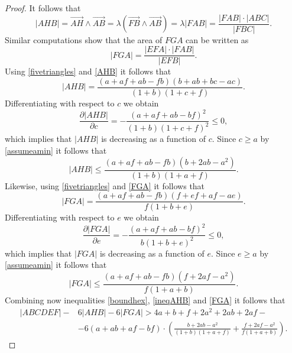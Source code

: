 \documentclass [10pt,oneside]{amsart}
\theoremstyle{definition}
\theoremstyle{plain}
\begin{document}
\begin{proof}
It follows that
\begin{equation}\label{AHB}
|AHB|=\overrightarrow{AH}\wedge\overrightarrow{AB}=\lambda(\overrightarrow{FB}\wedge\overrightarrow{AB})=
\lambda|FAB|=\frac{|FAB|\cdot|ABC|}{|FBC|}.
\end{equation}
Similar computations show that the area of $FGA$ can be written as
\begin{equation}\label{FGA}
|FGA|=\frac{|EFA|\cdot|FAB|}{|EFB|}.
\end{equation}
Using \eqref{fivetriangles} and \eqref{AHB} it follows that
\begin{equation*}
|AHB|=\frac{(a+af+ab-fb)(b+ab+bc-ac)}{(1+b)(1+c+f)}.
\end{equation*}
Differentiating with respect to $c$ we obtain
\begin{equation*}
\frac{\partial |AHB|}{\partial c}=-\frac{(a+af+ab-bf)^2}{(1+b)(1+c+f)^2}\le 0,
\end{equation*}
which implies that $|AHB|$ is decreasing as a function of $c$. Since $c\ge a$ by \eqref{assumeamin} it follows that
\begin{equation}\label{ineqAHB}
|AHB|\le\frac{(a+af+ab-fb)(b+2ab-a^2)}{(1+b)(1+a+f)}.
\end{equation}
Likewise, using \eqref{fivetriangles} and \eqref{FGA} it follows that
\begin{equation*}
|FGA|=\frac{(a+af+ab-fb)(f+ef+af-ae)}{f(1+b+e)}.
\end{equation*}
Differentiating with respect to $e$ we obtain
\begin{equation*}
\frac{\partial |FGA|}{\partial e}=-\frac{(a+af+ab-bf)^2}{b(1+b+e)^2}\le 0,
\end{equation*}
which implies that $|FGA|$ is decreasing as a function of $e$. Since $e\ge a$ by \eqref{assumeamin} it follows that
\begin{equation}\label{ineqFGA}
|FGA|\le\frac{(a+af+ab-fb)(f+2af-a^2)}{f(1+a+b)}.
\end{equation}
Combining now inequalities \eqref{boundhex}, \eqref{ineqAHB} and \eqref{FGA} it follows that
\begin{align}\label{final}
|ABCDEF|-&6|AHB|-6|FGA|> 4a+b+f+2a^2+2ab+2af-\\ &-6(a+ab+af-bf)\cdot\left(\frac{b+2ab-a^2}{(1+b)(1+a+f)}+\frac{f+2af-a^2}{f(1+a+b)}\right).
\end{align}


\end{proof}
\end{document}
